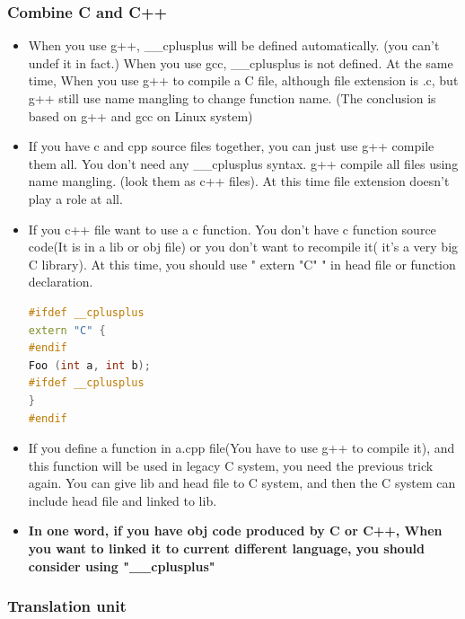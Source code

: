 \documentclass[a4paper,12pt,twoside]{book}
\begin{document}
\subsubsection{Combine C and C++}
\begin{itemize}

\item When you use g++,  \_\_cplusplus will be defined automatically. (you can't undef it in fact.) When you use gcc, \_\_cplusplus is not defined. At the same time, When you use g++ to compile a C file, although file extension is .c, but g++ still use name mangling to change function name.  (The conclusion is based on g++ and gcc on Linux system)

\item If you have c and cpp source files together, you can just use g++ compile them all. You don't need any \_\_cplusplus syntax.  g++ compile all files using name mangling. (look them as c++ files). At this time file extension doesn't play a role at all.

\item If you c++ file want to use a c function. You don't have c function source code(It is in a lib or obj file) or you don't want to recompile it( it's a very big C library). At this time, you should use " extern "C" " in head file or function declaration.
\begin{lstlisting}[frame=single, language=c++]
#ifdef __cplusplus
extern "C" {
#endif
Foo (int a, int b);
#ifdef __cplusplus
}
#endif
\end{lstlisting}

\item If you define a function in a.cpp file(You have to use g++ to compile it), and this function will be used in legacy C system, you need the previous trick again.  You can give lib and head file to C system,  and then the C system can include head file and linked to lib.

\item \textbf{In one word, if you have obj code produced by C or C++, When you want to linked it to current different language, you should consider using "\_\_cplusplus" }

\end{itemize}

\subsubsection{Translation unit}
\end{document}
